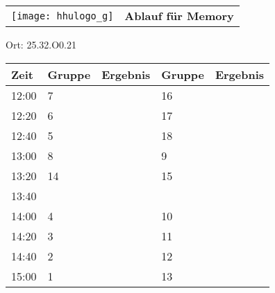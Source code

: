 \documentclass[a4paper,10pt]{article}
\def\spielg{Memory}
\def\raumg{25.32.O0.21}
\begin{document}
  \begin{tabularx}{\textwidth}{lc}
    \texttt{[image: hhulogo\_g]}
  & {\Huge \textbf{Ablauf für \spielg}}
  \end{tabularx}
  \LARGE
  \begin{center}
    \vspace{1cm} 
    Ort: \raumg
  \end{center}
    \vspace{2cm} 
    \begin{tabularx}{\textwidth}{X||X|X||X|X}
	\textbf{Zeit} &\textbf{Gruppe} & \textbf{Ergebnis} &\textbf{Gruppe} & \textbf{Ergebnis}  	\\ \hline \hline
	12:00 &	7	&	&16	&	\\ \hline
	12:20 &	6	&	&17	&	\\ \hline
	12:40 &	5	&	&18	&	\\ \hline

	13:00 &	8	&	&9	&	\\ \hline
	13:20 &	14	&	&15	&	\\ \hline
	13:40 &		&	&	&	\\ \hline

	14:00 &	4	&	&10	&	\\ \hline
	14:20 &	3	&	&11	&	\\ \hline
	14:40 &	2	&	&12	&	\\ \hline

	15:00 &	1	&	&13	&	\\ \hline
      
    \end{tabularx}
   
\end{document}
